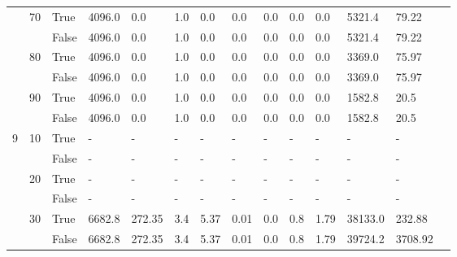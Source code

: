 \begin{landscape}
\begin{small}
\begin{longtable}[c]{@{}lll|ll|ll|ll|ll|lll@{}}
   & 70 & True  & 4096.0          & 0.0            & 1.0           & 0.0           & 0.0           & 0.0           & 0.0           & 0.0           & 5321.4        & 79.22       &  \\
   &    & False & 4096.0          & 0.0            & 1.0           & 0.0           & 0.0           & 0.0           & 0.0           & 0.0           & 5321.4        & 79.22       &  \\
   & 80 & True  & 4096.0          & 0.0            & 1.0           & 0.0           & 0.0           & 0.0           & 0.0           & 0.0           & 3369.0        & 75.97       &  \\
   &    & False & 4096.0          & 0.0            & 1.0           & 0.0           & 0.0           & 0.0           & 0.0           & 0.0           & 3369.0        & 75.97       &  \\
   & 90 & True  & 4096.0          & 0.0            & 1.0           & 0.0           & 0.0           & 0.0           & 0.0           & 0.0           & 1582.8        & 20.5        &  \\
   &    & False & 4096.0          & 0.0            & 1.0           & 0.0           & 0.0           & 0.0           & 0.0           & 0.0           & 1582.8        & 20.5        &  \\
  \midrule
9  & 10 & True  & -               & -              & -             & -             & -             & -             & -             & -             & -             & -           &  \\
   &    & False & -               & -              & -             & -             & -             & -             & -             & -             & -             & -           &  \\
   & 20 & True  & -               & -              & -             & -             & -             & -             & -             & -             & -             & -           &  \\
   &    & False & -               & -              & -             & -             & -             & -             & -             & -             & -             & -           &  \\
   & 30 & True  & 6682.8          & 272.35         & 3.4           & 5.37          & 0.01          & 0.0           & 0.8           & 1.79          & 38133.0       & 232.88      &  \\
   &    & False & 6682.8          & 272.35         & 3.4           & 5.37          & 0.01          & 0.0           & 0.8           & 1.79          & 39724.2       & 3708.92     &  \\

\end{longtable}
\end{small}
\end{landscape}
